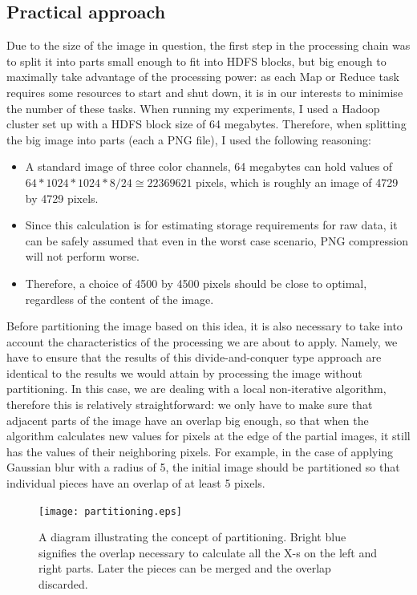 \documentclass [12pt,a4paper]{report}
\begin{document}
\subsection{Practical approach}

Due to the size of the image in question, the first step in the processing chain was to split it into parts small enough to fit into HDFS blocks, but big enough to maximally take advantage of the processing power: as each Map or Reduce task requires some resources to start and shut down, it is in our interests to minimise the number of these tasks. When running my experiments, I used a Hadoop cluster set up with a HDFS block size of 64 megabytes. Therefore, when splitting the big image into parts (each a PNG file), I used the following reasoning:

\begin{itemize}
\item A standard image of three color channels, 64 megabytes can hold values of $64*1024*1024*8/24\cong22369621$ pixels, which is roughly an image of 4729 by 4729 pixels.
\item Since this calculation is for estimating storage requirements for raw data, it can be safely assumed that even in the worst case scenario, PNG compression will not perform worse.
\item Therefore, a choice of 4500 by 4500 pixels should be close to optimal, regardless of the content of the image.
\end{itemize}

Before partitioning the image based on this idea, it is also necessary to take into account the characteristics of the processing we are about to apply. Namely, we have to ensure that the results of this divide-and-conquer type approach are identical to the results we would attain by processing the image without partitioning. In this case, we are dealing with a local non-iterative algorithm, therefore this is relatively straightforward: we only have to make sure that adjacent parts of the image have an overlap big enough, so that when the algorithm calculates new values for pixels at the edge of the partial images, it still has the values of their neighboring pixels. For example, in the case of applying Gaussian blur with a radius of 5, the initial image should be partitioned so that individual pieces have an overlap of at least 5 pixels.

\begin{figure}[h]
\begin{center}
\texttt{[image: partitioning.eps]} %
\caption[A diagram illustrating the concept of partitioning]{A diagram illustrating the concept of partitioning. Bright blue signifies the overlap necessary to calculate all the X-s on the left and right parts. Later the pieces can be merged and the overlap discarded.}
\label{fig_partitioning}
\end{center}
\end{figure}
\end{document}
